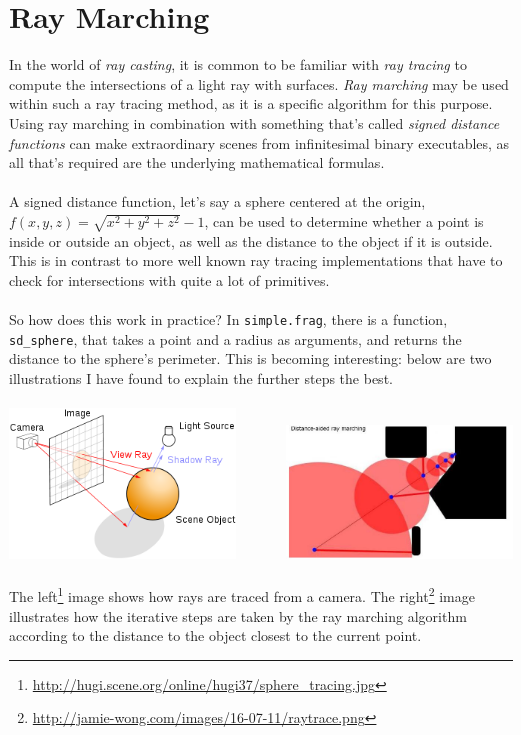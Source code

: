 \documentclass[abstract=off,oneside]{scrreprt}
\begin{document}
\section*{Ray Marching}
\label{sec-3}
In the world of \emph{ray casting}, it is common to be familiar with \emph{ray
tracing} to compute the intersections of a light ray with
surfaces. \emph{Ray marching} may be used within such a ray tracing method,
as it is a specific algorithm for this purpose. Using ray marching in
combination with something that's called \emph{signed distance functions}
can make extraordinary scenes from infinitesimal binary executables,
as all that's required are the underlying mathematical formulas.
\\\\
A signed distance function, let's say a sphere centered at the origin,
$f(x, y, z) = \sqrt{x^2 + y^2 + z^2} - 1$, can be used to determine
whether a point is inside or outside an object, as well as the
distance to the object if it is outside. This is in contrast to more
well known ray tracing implementations that have to check for
intersections with quite a lot of primitives.
\\\\
So how does this work in practice? In \verb~simple.frag~, there is a
function, \verb~sd_sphere~, that takes a point and a radius as arguments,
and returns the distance to the sphere's perimeter. This is becoming
interesting: below are two illustrations I have found to explain the
further steps the best.
\\\\
\includegraphics[width=0.45\textwidth]{./img/raytrace.png}
$\hspace{35pt}$
\includegraphics[width=0.45\textwidth]{./img/sphere_tracing.jpg}
\\\\
The left\footnote{\url{http://hugi.scene.org/online/hugi37/sphere_tracing.jpg}} image shows how rays are traced from a camera. The
right\footnote{\url{http://jamie-wong.com/images/16-07-11/raytrace.png}} image illustrates how the iterative steps are taken by the
ray marching algorithm according to the distance to the object closest
to the current point.
\end{document}
